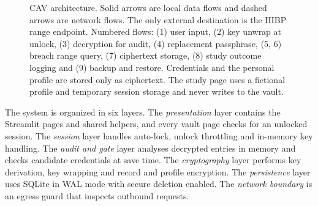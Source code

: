 \documentclass[conference]{IEEEtran}
\begin{document}
\begin{figure}[t]
\caption{CAV architecture. Solid arrows are local data flows and dashed arrows are network flows. The only external destination is the HIBP range endpoint. Numbered flows: (1) user input, (2) key unwrap at unlock, (3) decryption for audit, (4) replacement passphrase, (5, 6) breach range query, (7) ciphertext storage, (8) study outcome logging and (9) backup and restore. Credentials and the personal profile are stored only as ciphertext. The study page uses a fictional profile and temporary session storage and never writes to the vault.}
\label{fig:arch}
\end{figure}

The system is organized in six layers. The \emph{presentation} layer contains the Streamlit pages and shared helpers, and every vault page checks for an unlocked session. The \emph{session} layer handles auto-lock, unlock throttling and in-memory key handling. The \emph{audit and gate} layer analyses decrypted entries in memory and checks candidate credentials at save time. The \emph{cryptography} layer performs key derivation, key wrapping and record and profile encryption. The \emph{persistence} layer uses SQLite in WAL mode with secure deletion enabled. The \emph{network boundary} is an egress guard that inspects outbound requests.
\end{document}
